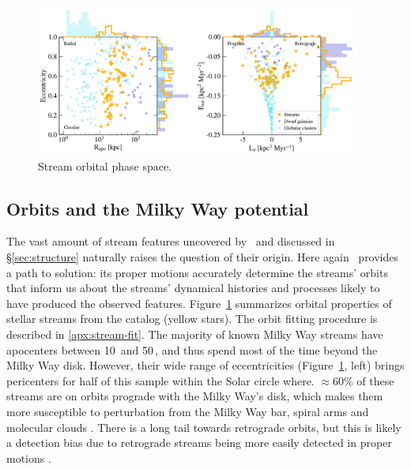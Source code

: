 \documentclass[final,5p,times,twocolumn,authoryear]{elsarticle}
\begin{document}
\begin{figure}
\begin{center}
\includegraphics[width=0.95\textwidth]{figures/orbital_phase_space.pdf}
\end{center}
\caption{%
Stream orbital phase space.
\label{fig:phase_space}
}
\end{figure}

\subsection{Orbits and the Milky Way potential}
The vast amount of stream features uncovered by \gaia\ and discussed in \S\ref{sec:structure} naturally raises the question of their origin.
Here again \gaia\ provides a path to solution: its proper motions accurately determine the streams' orbits that inform us about the streams' dynamical histories and processes likely to have produced the observed features.
Figure~\ref{fig:phase_space} summarizes orbital properties of stellar streams from the \citet{ibata:2024} catalog (yellow stars).
The orbit fitting procedure is described in \ref{apx:stream-fit}.
The majority of known Milky Way streams have apocenters between 10\,\unit{\kpc} and 50\,\unit{\kpc}, and thus spend most of the time beyond the Milky Way disk.
However, their wide range of eccentricities (Figure~\ref{fig:phase_space}, left) brings pericenters for half of this sample within the Solar circle where.
$\approx60\%$ of these streams are on orbits prograde with the Milky Way's disk, which makes them more susceptible to perturbation from the Milky Way bar, spiral arms and molecular clouds \citep[e.g.,][]{pearson:2017, banik:2019}.
There is a long tail towards retrograde orbits, but this is likely a detection bias due to retrograde streams being more easily detected in proper motions \citep[e.g.,][]{ibata:2021}.
\end{document}
